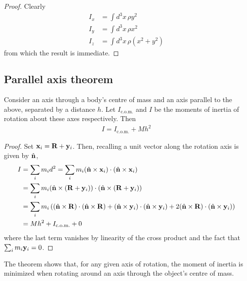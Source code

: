 \documentclass{../../template/note}
\begin{document}
    \begin{proof}
        Clearly
        \begin{align*}
            I_x &= \int d^3 x \, \rho y^2 \\
            I_y &= \int d^3 x \, \rho x^2 \\
            I_z &= \int d^3 x \, \rho(x^2+y^2)
        \end{align*}
        from which the result is immediate.
    \end{proof}
    
    \subsection{Parallel axis theorem}
    
    \begin{proposition}
        Consider an axis through a body's centre of mass and an axis parallel to the above, separated by a distance \(h\). Let \(I_\text{c.o.m.}\) and \(I\) be the moments of inertia of rotation about these axes respectively. Then
        \begin{align*}
            I = I_\text{c.o.m.} + Mh^2
        \end{align*}
    \end{proposition}
    
    \begin{proof}
        Set \(\V x_i = \V R + \V y_i\). Then, recalling a unit vector along the rotation axis is given by \(\hvec n\),
        \begin{align*}
            I &= \sum_i m_i d^2 = \sum_i m_i (\hvec n \times \V x_i) \cdot (\hvec n \times \V x_i) \\
            &= \sum_i m_i (\hvec n \times (\V R + \V y_i)) \cdot (\hvec n \times (\V R + \V y_i)) \\
            &= \sum_i m_i \left((\hvec n \times \V R) \cdot (\hvec n \times \V R) + (\hvec n \times \V y_i) \cdot (\hvec n \times \V y_i) + 2(\hvec n \times \V R) \cdot (\hvec n \times \V y_i)\right) \\
            &= Mh^2 + I_{\text{c.o.m.}} + 0
        \end{align*}
        where the last term vanishes by linearity of the cross product and the fact that \(\sum_i m_i \V y_i = 0\).        
    \end{proof}
    
    \begin{remark*}
        The theorem shows that, for any given axis of rotation, the moment of inertia is minimized when rotating around an axis through the object's centre of mass.
    \end{remark*}
    
\end{document}
